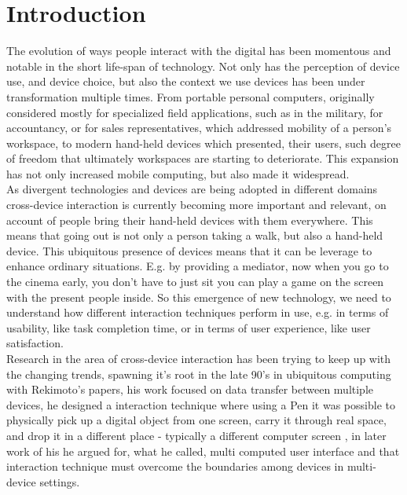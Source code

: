 \section{Introduction}
The evolution of ways people interact with the digital has been momentous and notable in the short life-span of technology. Not only has the perception of device use, and device choice, but also the context we use devices has been under transformation multiple times. From portable personal computers, originally considered mostly for specialized field applications, such as in the military, for accountancy, or for sales representatives, which addressed mobility of a person's workspace, to modern hand-held devices which presented, their users, such degree of freedom that ultimately workspaces are starting to deteriorate. This expansion has not only increased mobile computing, but also made it widespread. \\

As divergent technologies and devices are being adopted in different domains cross-device interaction is currently becoming more important and relevant, on account of people bring their hand-held devices with them everywhere. This means that going out is not only a person taking a walk, but also a hand-held device. This ubiquitous presence of devices means that it can be leverage to enhance ordinary situations. E.g. by providing a mediator, now when you go to the cinema early, you don't have to just sit you can play a game on the screen with the present people inside. So this emergence of new technology, we need to understand how different interaction techniques perform in use, e.g. in terms of usability, like task completion time, or in terms of user experience, like user satisfaction. \\

Research in the area of cross-device interaction has been trying to keep up with the changing trends, spawning it's root in the late 90's in ubiquitous computing with Rekimoto's papers, his work focused on data transfer between multiple devices, he designed a interaction technique where using a Pen it was possible to physically pick up a digital object from one screen, carry it through real space, and drop it in a different place - typically a different computer screen \cite{Rekimoto:1997}, in later work of his he argued for, what he called, multi computed user interface and that interaction technique must overcome the boundaries among devices in multi-device settings\cite{Rekimoto:1998}.

